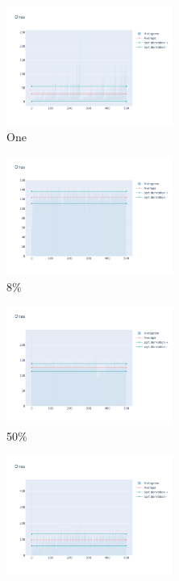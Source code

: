 \documentclass[12pt, fleqn]{report}                             %
\theoremstyle{break}                                            %
\begin{document}
      \begin{figure}[ht!]
        \centering
        \begin{subfigure}[b]{0.4\linewidth}
          \includegraphics[width=0.6\textwidth]{Images/18/dia-a.png}
          \caption{One}
        \end{subfigure}
        \begin{subfigure}[b]{0.4\linewidth}
          \includegraphics[width=0.6\textwidth]{Images/18/dia-b.png}
          \caption{8\%}
        \end{subfigure}
        \begin{subfigure}[b]{0.4\linewidth}
          \includegraphics[width=0.6\textwidth]{Images/18/dia-c.png}
          \caption{50\%}
        \end{subfigure}
        \begin{subfigure}[b]{0.4\linewidth}
          \includegraphics[width=0.6\textwidth]{Images/18/dia-d.png}

\end{subfigure}
\end{figure}
\end{document}
